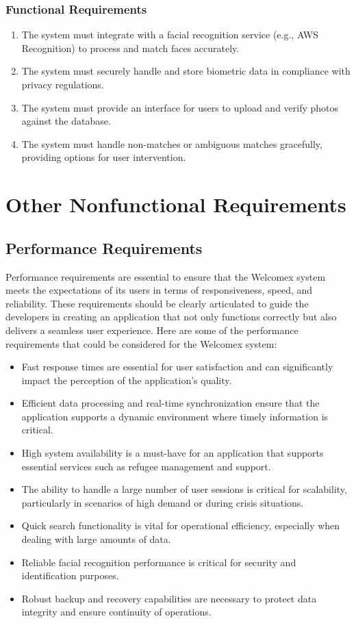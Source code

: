 \documentclass{scrreprt}
\begin{document}
\subsection{Functional Requirements}
\begin{enumerate}[resume*=func-req, leftmargin=60pt]
    \item The system must integrate with a facial recognition service (e.g., AWS Recognition) to process and match faces accurately.
    \item The system must securely handle and store biometric data in compliance with privacy regulations.
    \item The system must provide an interface for users to upload and verify photos against the database.
    \item The system must handle non-matches or ambiguous matches gracefully, providing options for user intervention.
\end{enumerate}

\chapter{Other Nonfunctional Requirements}
\section{Performance Requirements}
Performance requirements are essential to ensure that the Welcomex system meets the expectations of its users in terms of responsiveness, speed, and reliability. These requirements should be clearly articulated to guide the developers in creating an application that not only functions correctly but also delivers a seamless user experience. Here are some of the performance requirements that could be considered for the Welcomex system:

\begin{itemize}
    \item Fast response times are essential for user satisfaction and can significantly impact the perception of the application's quality.
    \item Efficient data processing and real-time synchronization ensure that the application supports a dynamic environment where timely information is critical.
    \item High system availability is a must-have for an application that supports essential services such as refugee management and support.
    \item The ability to handle a large number of user sessions is critical for scalability, particularly in scenarios of high demand or during crisis situations.
    \item Quick search functionality is vital for operational efficiency, especially when dealing with large amounts of data.
    \item Reliable facial recognition performance is critical for security and identification purposes.
    \item Robust backup and recovery capabilities are necessary to protect data integrity and ensure continuity of operations.
\end{itemize}
\end{document}
